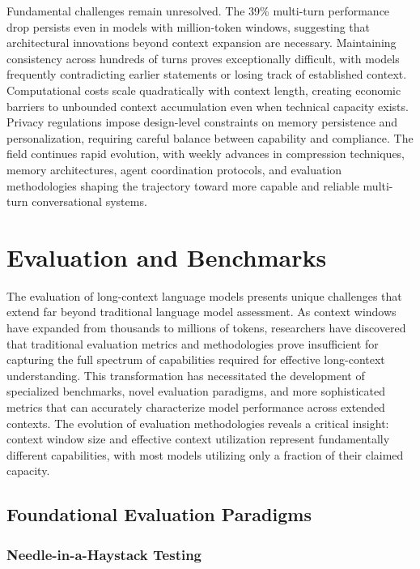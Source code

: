 Fundamental challenges remain unresolved. The 39\% multi-turn performance drop persists even in models with million-token windows, suggesting that architectural innovations beyond context expansion are necessary. Maintaining consistency across hundreds of turns proves exceptionally difficult, with models frequently contradicting earlier statements or losing track of established context. Computational costs scale quadratically with context length, creating economic barriers to unbounded context accumulation even when technical capacity exists. Privacy regulations impose design-level constraints on memory persistence and personalization, requiring careful balance between capability and compliance. The field continues rapid evolution, with weekly advances in compression techniques, memory architectures, agent coordination protocols, and evaluation methodologies shaping the trajectory toward more capable and reliable multi-turn conversational systems.
\section{Evaluation and Benchmarks}
\label{sec:evaluation}

The evaluation of long-context language models presents unique challenges that extend far beyond traditional language model assessment. As context windows have expanded from thousands to millions of tokens, researchers have discovered that traditional evaluation metrics and methodologies prove insufficient for capturing the full spectrum of capabilities required for effective long-context understanding. This transformation has necessitated the development of specialized benchmarks, novel evaluation paradigms, and more sophisticated metrics that can accurately characterize model performance across extended contexts. The evolution of evaluation methodologies reveals a critical insight: context window size and effective context utilization represent fundamentally different capabilities, with most models utilizing only a fraction of their claimed capacity.

\subsection{Foundational Evaluation Paradigms}

\subsubsection{Needle-in-a-Haystack Testing}


